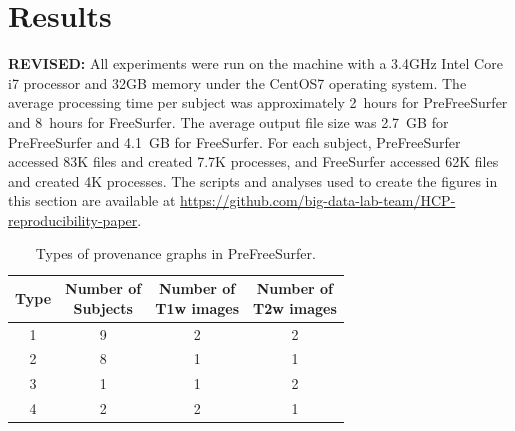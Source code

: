 \documentclass[a4paper,num-refs]{oup-contemporary}
\newcommand{\revised}[1]{\color{blue}\textbf{REVISED:}#1\color{black}}
\newcommand{\tristan}[1]{\color{orange}\textbf{From Tristan:}#1\color{black}}
\begin{document}

\section{Results}
\revised{
All experiments were run on the machine with a 3.4GHz Intel Core i7 processor 
and 32GB memory under the CentOS7 operating system.
The average processing time per subject was approximately 2~hours for
PreFreeSurfer and 8~hours for FreeSurfer. The average output file size was
2.7~GB for PreFreeSurfer and 4.1~GB for FreeSurfer.
For each subject, PreFreeSurfer accessed
83K files and created 7.7K processes, and FreeSurfer accessed 62K files and 
created 4K processes.
The scripts and analyses used to create the figures in this section are available at 
\url{https://github.com/big-data-lab-team/HCP-reproducibility-paper}.
}

\begin{table}[b]
  \centering
  \begin{threeparttable}
  \caption{Types of provenance graphs in PreFreeSurfer.}
  \label{table:data-clusters}
  \begin{tabular}{cc|cc}
  \toprule
  Type   &   \makecell{Number of \\ Subjects}   &  \makecell{Number of \\ T1w images}          & \makecell{Number of \\ T2w images}   \\ \midrule
  1      &               9                      &  2 & 2 \\
  2      &               8                      &  1 & 1 \\
  3      &               1                      &  1 & 2 \\
  4      &               2                      &  2 & 1\\
  \bottomrule
  \end{tabular}
  \end{threeparttable}
  \end{table}
\end{document}
